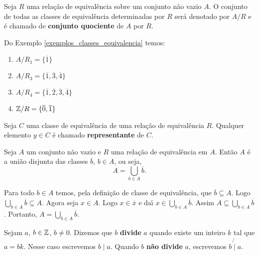 \begin{definicao}
    Seja $R$ uma rela\c{c}\~ao de equival\^encia sobre um conjunto n\~ao vazio $A$. O conjunto de todas as classes de equival{\^e}ncia determinadas por $R$ ser{\'a} denotado por $A/R$ e {\'e} chamado de \textbf{conjunto quociente} de $A$ por $R$.
\end{definicao}

\begin{exemplos}
    Do Exemplo \ref{exemplos_classes_equivalencia} temos:
    \begin{enumerate}[label={\arabic*})]
        \item $A/R_1 = \{\overline{1}\}$
        \item $A/R_3 = \{\overline{1},\overline{3},\overline{4}\}$
        \item $A/R_4 = \{\overline{1},\overline{2},\overline{3},\overline{4}\}$
        \item $\mathbb{Z}/R = \{\overline{0},\overline{1}\}$
    \end{enumerate}
\end{exemplos}

\begin{definicao}
    Seja $C$ uma classe de equival{\^e}ncia de uma rela{\c c}{\~a}o de equival{\^e}ncia $R$. Qualquer elemento $y\in C$ {\'e} chamado \textbf{representante} de $C$.
\end{definicao}

\begin{proposicao}
    Seja $A$ um conjunto n{\~a}o vazio e $R$ uma rela{\c c}{\~a}o de equival{\^e}ncia em $A$. Ent{\~a}o $A$ {\'e} a uni{\~a}o disjunta das classes $\overline{b}$, $b \in A$, ou seja,
    \[
        A = \bigcup_{b\in A}\overline{b}.
    \]
\end{proposicao}
\begin{prova}
    Para todo $b\in A$ temos, pela defini\c{c}\~ao de classe de equival\^encia, que $\overline{b}\subseteq A$. Logo $\bigcup_{b\in A}\overline{b}\subseteq A$. Agora seja $x\in A$. Logo $x \in \overline{x}$ e da{\'\i} $x\in \bigcup_{b\in A}\overline{b}$. Assim $A\subseteq\bigcup_{b\in A}\overline{b}$. Portanto, $A=\bigcup_{b\in A}\overline{b}$.
\end{prova}

\begin{definicao}
    Sejam $a$, $b \in \mathbb{Z}$, $b \neq 0$. Dizemos que $b$ \textbf{divide} $a$ quando existe um inteiro $k$ tal que $a=bk$.
    Nesse caso escrevemos $b \mid a$. Quando $b$ \textbf{n{\~a}o divide} $a$, escrevemos $b\not{\mid}a$.
\end{definicao}

